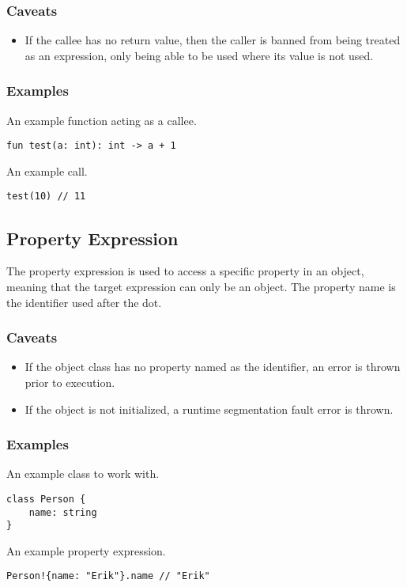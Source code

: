 \subsubsection{Caveats}

\begin{itemize}
    \item If the callee has no return value, then the caller is banned from being treated as an expression, only being
        able to be used where its value is not used.
\end{itemize}

\subsubsection{Examples}

An example function acting as a callee.
\begin{lstlisting}
fun test(a: int): int -> a + 1
\end{lstlisting}
An example call.
\begin{lstlisting}
test(10) // 11
\end{lstlisting}

\subsection{Property Expression}

The property expression is used to access a specific property in an object, meaning that the target expression can only be
an object. The property name is the identifier used after the dot.

\subsubsection{Caveats}

\begin{itemize}
    \item If the object class has no property named as the identifier, an error is thrown prior to execution.
    \item If the object is not initialized, a runtime segmentation fault error is thrown.
\end{itemize}

\subsubsection{Examples}

An example class to work with.
\begin{lstlisting}
class Person {
    name: string
}
\end{lstlisting}
An example property expression.
\begin{lstlisting}
Person!{name: "Erik"}.name // "Erik"
\end{lstlisting}

